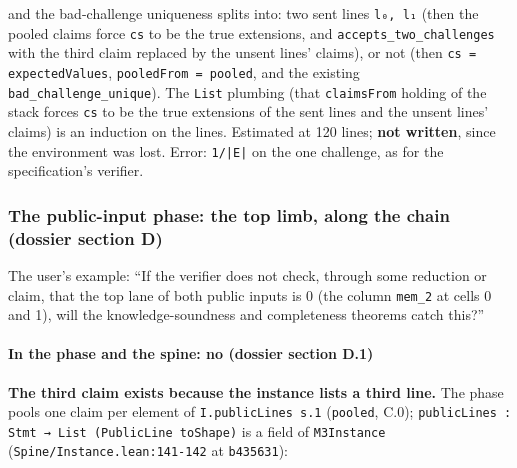 and the bad-challenge uniqueness splits into: two sent lines \texttt{l₀,\allowbreak{} l₁} (then the pooled claims force \texttt{cs} to be the true extensions, and \texttt{accepts\_\allowbreak{}two\_\allowbreak{}challenges} with the third claim replaced by the unsent lines' claims), or not (then \texttt{cs = expectedValues}, \texttt{pooledFrom = pooled}, and the existing \texttt{bad\_\allowbreak{}challenge\_\allowbreak{}unique}). The \texttt{List} plumbing (that \texttt{claimsFrom} holding of the stack forces \texttt{cs} to be the true extensions of the sent lines and the unsent lines' claims) is an induction on the lines. Estimated at 120 lines; \textbf{not written}, since the environment was lost. Error: \texttt{1/\allowbreak{}|E|} on the one challenge, as for the specification's verifier.

\subsubsection{The public-input phase: the top limb, along the chain (dossier section D)}\label{sec:gen-probes-pubinput-toplimb}

The user's example: \enquote{If the verifier does not check, through some reduction or claim, that the top lane of both public inputs is 0 (the column \texttt{mem\_\allowbreak{}2} at cells 0 and 1), will the knowledge-soundness and completeness theorems catch this?}

\paragraph{In the phase and the spine: no (dossier section D.1)}\label{sec:gen-pubinput-D1}

\textbf{The third claim exists because the instance lists a third line.} The phase pools one claim per element of \texttt{I.\allowbreak{}publicLines s.\allowbreak{}1} (\texttt{pooled}, C.0); \texttt{p\allowbreak{}u\allowbreak{}b\allowbreak{}l\allowbreak{}i\allowbreak{}c\allowbreak{}L\allowbreak{}i\allowbreak{}n\allowbreak{}e\allowbreak{}s\allowbreak{} :\allowbreak{} S\allowbreak{}t\allowbreak{}m\allowbreak{}t\allowbreak{} →\allowbreak{} L\allowbreak{}i\allowbreak{}s\allowbreak{}t\allowbreak{} (\allowbreak{}P\allowbreak{}u\allowbreak{}b\allowbreak{}l\allowbreak{}i\allowbreak{}c\allowbreak{}L\allowbreak{}i\allowbreak{}n\allowbreak{}e\allowbreak{} t\allowbreak{}o\allowbreak{}S\allowbreak{}h\allowbreak{}a\allowbreak{}p\allowbreak{}e\allowbreak{})} is a field of \texttt{M3Instance} (\texttt{Spine/\allowbreak{}Instance.\allowbreak{}lean:141-{}142} at \texttt{b435631}):


